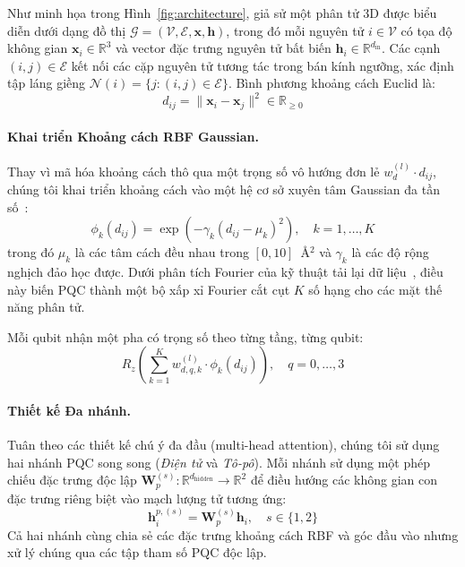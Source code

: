 \documentclass[10pt,twocolumn,letterpaper]{article}
\begin{document}
Như minh họa trong Hình~\ref{fig:architecture}, giả sử một phân tử 3D được biểu diễn dưới dạng đồ thị $\mathcal{G} = (\mathcal{V}, \mathcal{E}, \mathbf{x}, \mathbf{h})$, trong đó mỗi nguyên tử $i \in \mathcal{V}$ có tọa độ không gian $\mathbf{x}_i \in \mathbb{R}^3$ và vector đặc trưng nguyên tử bất biến $\mathbf{h}_i \in \mathbb{R}^{d_{\mathrm{in}}}$. Các cạnh $(i, j) \in \mathcal{E}$ kết nối các cặp nguyên tử tương tác trong bán kính ngưỡng, xác định tập láng giềng $\mathcal{N}(i) = \{j : (i, j) \in \mathcal{E}\}$. Bình phương khoảng cách Euclid là:
\begin{equation}
    d_{ij} = \|\mathbf{x}_i - \mathbf{x}_j\|^2 \in \mathbb{R}_{\ge 0}
\end{equation}

\paragraph{Khai triển Khoảng cách RBF Gaussian.}
Thay vì mã hóa khoảng cách thô qua một trọng số vô hướng đơn lẻ $w_d^{(l)} \cdot d_{ij}$, chúng tôi khai triển khoảng cách vào một hệ cơ sở xuyên tâm Gaussian đa tần số~\cite{schütt2017schnetcontinuousfilterconvolutionalneural}:
\begin{equation}
    \phi_k(d_{ij}) = \exp\left(-\gamma_k (d_{ij} - \mu_k)^2\right), \quad k = 1, \ldots, K
    \label{eq:rbf}
\end{equation}
trong đó $\mu_k$ là các tâm cách đều nhau trong $[0, 10]$~\AA$^2$ và $\gamma_k$ là các độ rộng nghịch đảo học được. Dưới phân tích Fourier của kỹ thuật tải lại dữ liệu~\cite{Perez-Salinas:2019pjx, Schuld:2020enb}, điều này biến PQC thành một bộ xấp xỉ Fourier cắt cụt $K$ số hạng cho các mặt thế năng phân tử.

Mỗi qubit nhận một pha có trọng số theo từng tầng, từng qubit:
\begin{equation}
    R_z\!\left(\sum_{k=1}^K w_{d,q,k}^{(l)} \cdot \phi_k(d_{ij})\right), \quad q = 0, \ldots, 3
\end{equation}

\paragraph{Thiết kế Đa nhánh.}
Tuân theo các thiết kế chú ý đa đầu (multi-head attention), chúng tôi sử dụng hai nhánh PQC song song (\textit{Điện tử} và \textit{Tô-pô}). Mỗi nhánh sử dụng một phép chiếu đặc trưng độc lập $\mathbf{W}_p^{(s)}: \mathbb{R}^{d_{\mathrm{hidden}}} \to \mathbb{R}^2$ để điều hướng các không gian con đặc trưng riêng biệt vào mạch lượng tử tương ứng:
\begin{equation}
    \mathbf{h}_i^{p,(s)} = \mathbf{W}_p^{(s)} \mathbf{h}_i, \quad s \in \{1, 2\}
\end{equation}
Cả hai nhánh cùng chia sẻ các đặc trưng khoảng cách RBF và góc đầu vào nhưng xử lý chúng qua các tập tham số PQC độc lập.
\end{document}

